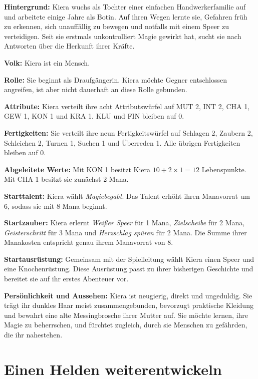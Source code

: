 \begin{beispiel}[title=Kiera erschaffen]
\textbf{Hintergrund:} Kiera wuchs als Tochter einer einfachen Handwerkerfamilie auf und arbeitete einige Jahre als Botin. Auf ihren Wegen lernte sie, Gefahren früh zu erkennen, sich unauffällig zu bewegen und notfalls mit einem Speer zu verteidigen. Seit sie erstmals unkontrolliert Magie gewirkt hat, sucht sie nach Antworten über die Herkunft ihrer Kräfte.

\textbf{Volk:} Kiera ist ein Mensch.

\textbf{Rolle:} Sie beginnt als Draufgängerin. Kiera möchte Gegner entschlossen angreifen, ist aber nicht dauerhaft an diese Rolle gebunden.

\textbf{Attribute:} Kiera verteilt ihre acht Attributswürfel auf MUT 2, INT 2, CHA 1, GEW 1, KON 1 und KRA 1. KLU und FIN bleiben auf 0.

\textbf{Fertigkeiten:} Sie verteilt ihre neun Fertigkeitswürfel auf Schlagen 2, Zaubern 2, Schleichen 2, Turnen 1, Suchen 1 und Überreden 1. Alle übrigen Fertigkeiten bleiben auf 0.

\textbf{Abgeleitete Werte:} Mit KON 1 besitzt Kiera $10 + 2 \times 1 = 12$ Lebenspunkte. Mit CHA 1 besitzt sie zunächst 2 Mana.

\textbf{Starttalent:} Kiera wählt \emph{Magiebegabt}. Das Talent erhöht ihren Manavorrat um 6, sodass sie mit 8 Mana beginnt.

\textbf{Startzauber:} Kiera erlernt \emph{Weißer Speer} für 1 Mana, \emph{Zielscheibe} für 2 Mana, \emph{Geisterschritt} für 3 Mana und \emph{Herzschlag spüren} für 2 Mana. Die Summe ihrer Manakosten entspricht genau ihrem Manavorrat von 8.

\textbf{Startausrüstung:} Gemeinsam mit der Spielleitung wählt Kiera einen Speer und eine Knochenrüstung. Diese Ausrüstung passt zu ihrer bisherigen Geschichte und bereitet sie auf ihr erstes Abenteuer vor.

\textbf{Persönlichkeit und Aussehen:} Kiera ist neugierig, direkt und ungeduldig. Sie trägt ihr dunkles Haar meist zusammengebunden, bevorzugt praktische Kleidung und bewahrt eine alte Messingbrosche ihrer Mutter auf. Sie möchte lernen, ihre Magie zu beherrschen, und fürchtet zugleich, durch sie Menschen zu gefährden, die ihr nahestehen.
\end{beispiel}

\section{Einen Helden weiterentwickeln}

